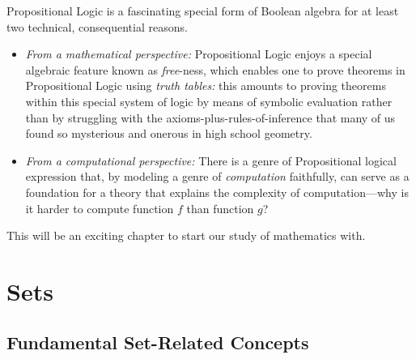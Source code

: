 \begin{itemize}
\smallskip

Propositional Logic is a fascinating special form of Boolean algebra for at least two technical, consequential reasons.
  \begin{itemize}
  \item
{\em From a mathematical perspective:}
Propositional Logic enjoys a special algebraic feature known as {\it free}-ness, which enables one to prove theorems in Propositional Logic using {\em truth tables:} this amounts to proving theorems within this special system of logic by means of symbolic evaluation rather than by struggling with the axioms-plus-rules-of-inference that many of us found so mysterious and onerous in high school geometry.
  \medskip\item
{\em From a computational perspective:}
There is a genre of Propositional logical expression that, by modeling a genre of {\em computation} faithfully, can serve as a foundation for a theory that explains the complexity of computation---why is it harder to compute function $f$ than function $g$?
  \end{itemize}
\end{itemize}

\medskip

This will be an exciting chapter to start our study of mathematics with.

\section{Sets}
\label{sec:sets}

\subsection{Fundamental Set-Related Concepts}
\label{sec:set-concepts}

